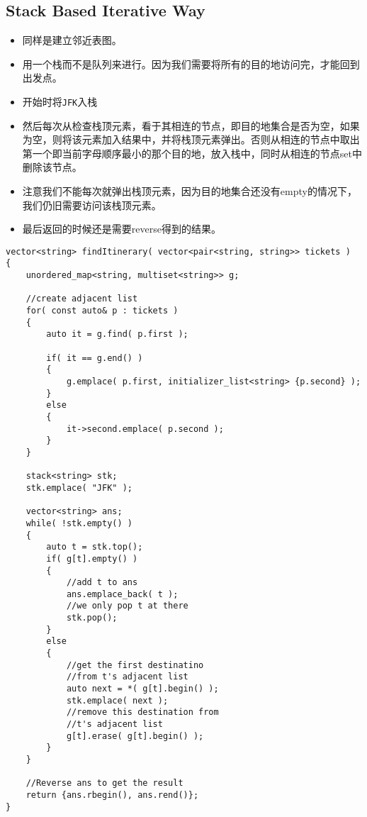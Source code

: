 \subsection{Stack Based Iterative Way}
\begin{itemize}
\item 同样是建立邻近表图。
\item 用一个栈而不是队列来进行。因为我们需要将所有的目的地访问完，才能回到出发点。
\item 开始时将\texttt{JFK}入栈
\item 然后每次从检查栈顶元素，看于其相连的节点，即目的地集合是否为空，如果为空，则将该元素加入结果中，并将栈顶元素弹出。否则从相连的节点中取出第一个即当前字母顺序最小的那个目的地，放入栈中，同时从相连的节点set中删除该节点。
\item 注意我们不能每次就弹出栈顶元素，因为目的地集合还没有empty的情况下，我们仍旧需要访问该栈顶元素。
\item 最后返回的时候还是需要reverse得到的结果。
\end{itemize}
\begin{lstlisting}[style=customc, caption={Stack}]
vector<string> findItinerary( vector<pair<string, string>> tickets )
{
    unordered_map<string, multiset<string>> g;

    //create adjacent list
    for( const auto& p : tickets )
    {
        auto it = g.find( p.first );

        if( it == g.end() )
        {
            g.emplace( p.first, initializer_list<string> {p.second} );
        }
        else
        {
            it->second.emplace( p.second );
        }
    }

    stack<string> stk;
    stk.emplace( "JFK" );

    vector<string> ans;
    while( !stk.empty() )
    {
        auto t = stk.top();
        if( g[t].empty() )
        {
            //add t to ans
            ans.emplace_back( t );
            //we only pop t at there
            stk.pop();
        }
        else
        {
            //get the first destinatino
            //from t's adjacent list
            auto next = *( g[t].begin() );
            stk.emplace( next );
            //remove this destination from
            //t's adjacent list
            g[t].erase( g[t].begin() );
        }
    }

    //Reverse ans to get the result
    return {ans.rbegin(), ans.rend()};
}

\end{lstlisting}

